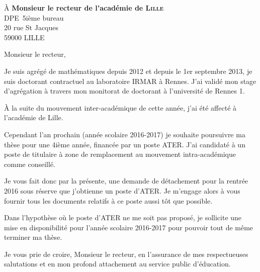 \documentclass[11pt]{lettre}
\begin{document}
\begin{letter}{À \textbf{Monsieur le recteur de l'académie de \textsc{Lille}}\\
						DPE\,	5ième bureau\\
						20 rue St Jacques\\
						59000 LILLE }
\address{Basile~\textsc{Pillet}\\
8 allée de Berne,\\
35200 RENNES}
\nofax
\def\concname{Objet :~} %
\opening{Monsieur le recteur,}

Je suis agrégé de mathématiques depuis 2012 et depuis le 1er septembre 2013, je suis doctorant contractuel au laboratoire IRMAR à Rennes. J'ai validé mon stage d'agrégation à travers mon monitorat de doctorant à l'université de Rennes 1.

À la suite du mouvement inter-académique de cette année, j'ai été affecté à l'académie de Lille.

Cependant l'an prochain (année scolaire 2016-2017) je souhaite poursuivre ma thèse pour une 4ième année, financée par un poste ATER. J'ai candidaté à un poste de titulaire à zone de remplacement au mouvement intra-académique comme conseillé.

Je vous fait donc par la présente, une demande de détachement pour la rentrée 2016 sous réserve que j'obtienne un poste d'ATER. Je m'engage alors à vous fournir tous les documents relatifs à ce poste aussi tôt que possible.

Dans l'hypothèse où le poste d'ATER ne me soit pas proposé, je sollicite une mise en disponibilité pour l'année scolaire 2016-2017 pour pouvoir tout de même terminer ma thèse.

\closing{Je vous prie de croire, Monsieur le recteur, en l’assurance de mes respectueuses salutations et en mon profond attachement au service public d’éducation.}

\end{letter}
\end{document}
